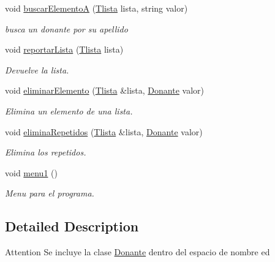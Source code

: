 \begin{DoxyCompactItemize}
void \hyperlink{namespaceed_ad87c13f515ffef550a49d3bb9d619744}{buscar\+Elemento\+A} (\hyperlink{structed_1_1nodo}{Tlista} lista, string valor)
\begin{DoxyCompactList}\small\item\em busca un donante por su apellido \end{DoxyCompactList}\item 
void \hyperlink{namespaceed_a0c58812628351496f55163eb0874d760}{reportar\+Lista} (\hyperlink{structed_1_1nodo}{Tlista} lista)
\begin{DoxyCompactList}\small\item\em Devuelve la lista. \end{DoxyCompactList}\item 
void \hyperlink{namespaceed_a2f9ad864607e928ff02c22542948b729}{eliminar\+Elemento} (\hyperlink{structed_1_1nodo}{Tlista} \&lista, \hyperlink{classed_1_1Donante}{Donante} valor)
\begin{DoxyCompactList}\small\item\em Elimina un elemento de una lista. \end{DoxyCompactList}\item 
void \hyperlink{namespaceed_a5ac121db2f2aea4d060b073af5a80555}{elimina\+Repetidos} (\hyperlink{structed_1_1nodo}{Tlista} \&lista, \hyperlink{classed_1_1Donante}{Donante} valor)
\begin{DoxyCompactList}\small\item\em Elimina los repetidos. \end{DoxyCompactList}\item 
\hypertarget{namespaceed_a3294a2539309af021437a7d4dd542bea}{}void \hyperlink{namespaceed_a3294a2539309af021437a7d4dd542bea}{menu1} ()\label{namespaceed_a3294a2539309af021437a7d4dd542bea}

\begin{DoxyCompactList}\small\item\em Menu para el programa. \end{DoxyCompactList}\end{DoxyCompactItemize}


\subsection{Detailed Description}
\begin{DoxyAttention}{Attention}
Se incluye la clase \hyperlink{classed_1_1Donante}{Donante} dentro del espacio de nombre ed 
\end{DoxyAttention}


